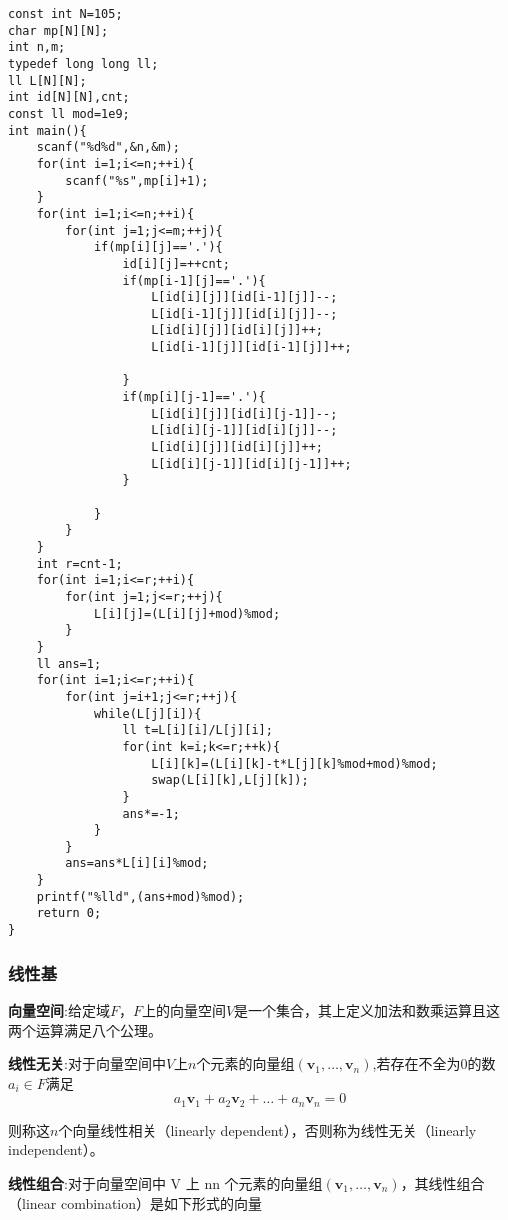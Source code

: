 \documentclass[UTF8]{ctexart}
\begin{document}
\begin{lstlisting} 
const int N=105;
char mp[N][N];
int n,m;
typedef long long ll;
ll L[N][N];
int id[N][N],cnt;
const ll mod=1e9;
int main(){
    scanf("%d%d",&n,&m);
    for(int i=1;i<=n;++i){
        scanf("%s",mp[i]+1);
    }
    for(int i=1;i<=n;++i){
        for(int j=1;j<=m;++j){
            if(mp[i][j]=='.'){
                id[i][j]=++cnt;
                if(mp[i-1][j]=='.'){
                    L[id[i][j]][id[i-1][j]]--;
                    L[id[i-1][j]][id[i][j]]--;
                    L[id[i][j]][id[i][j]]++;
                    L[id[i-1][j]][id[i-1][j]]++;
                    
                }
                if(mp[i][j-1]=='.'){
                    L[id[i][j]][id[i][j-1]]--;
                    L[id[i][j-1]][id[i][j]]--;
                    L[id[i][j]][id[i][j]]++;
                    L[id[i][j-1]][id[i][j-1]]++;
                }
                
            }
        }
    }
    int r=cnt-1;
    for(int i=1;i<=r;++i){
        for(int j=1;j<=r;++j){
            L[i][j]=(L[i][j]+mod)%mod;
        }
    }
    ll ans=1;
    for(int i=1;i<=r;++i){
        for(int j=i+1;j<=r;++j){
            while(L[j][i]){
                ll t=L[i][i]/L[j][i];
                for(int k=i;k<=r;++k){
                    L[i][k]=(L[i][k]-t*L[j][k]%mod+mod)%mod;
                    swap(L[i][k],L[j][k]);
                }
                ans*=-1;
            }
        }
        ans=ans*L[i][i]%mod;
    }
    printf("%lld",(ans+mod)%mod);
    return 0;
}    
\end{lstlisting}

\subsubsection{线性基}

\textbf{向量空间}:给定域$F$，$F$上的向量空间$V$是一个集合，其上定义加法和数乘运算且这两个运算满足八个公理。

\textbf{线性无关}:对于向量空间中$V$上$n$个元素的向量组$(\mathbf{v}_1, \ldots, \mathbf{v}_n)$,若存在不全为$0$的数$a_i \in F$满足
$$
a_{1}\mathbf{v}_{1}+a_{2}\mathbf {v}_{2}+\ldots +a_{n}\mathbf{v}_{n} = 0
$$

则称这$n$个向量线性相关（linearly dependent），否则称为线性无关（linearly independent）。

\textbf{线性组合}:对于向量空间中 V 上 nn 个元素的向量组$(\mathbf{v}_1, \ldots, \mathbf{v}_n)$，其线性组合（linear combination）是如下形式的向量
\end{document}
